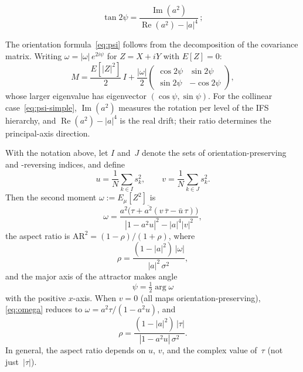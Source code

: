 \documentclass[10pt,a4paper]{amsart}
\begin{document}
\begin{equation}\label{eq:psi-simple}
  \tan 2\psi = \frac{\operatorname{Im}(a^2)}{\operatorname{Re}(a^2)-|a|^4}\,;
\end{equation}

\begin{remark}\label{rem:orientation}
The orientation formula~\eqref{eq:psi} follows from the decomposition
of the covariance matrix.  Writing $\omega = |\omega|\, e^{2i\psi}$
for $Z = X + iY$ with $E[Z]=0$:
\[
  M = \frac{E[|Z|^2]}{2}\,I
    + \frac{|\omega|}{2}
      \begin{pmatrix}\cos 2\psi & \sin 2\psi \\ \sin 2\psi & -\cos 2\psi\end{pmatrix},
\]
whose larger eigenvalue has eigenvector $(\cos\psi, \sin\psi)$.
For the collinear case~\eqref{eq:psi-simple},
$\operatorname{Im}(a^2)$ measures the rotation per level of the
IFS hierarchy, and $\operatorname{Re}(a^2)-|a|^4$ is the real drift;
their ratio determines the principal-axis direction.
\end{remark}

\begin{theorem}\label{thm:family}
With the notation above, let $I$ and~$J$ denote the sets of
orientation-preserving and -reversing indices, and define
\[
  u = \frac{1}{N}\!\sum_{k \in I}s_k^2,\qquad
  v = \frac{1}{N}\!\sum_{k \in J}s_k^2.
\]
Then the second moment $\omega := E_\mu[Z^2]$ is
\begin{equation}\label{eq:omega}
  \omega
  = \frac{a^2\bigl(\tau + \overline{a^2}(v\,\overline{\tau}
          - \bar{u}\,\tau)\bigr)}
         {|1-a^2 u|^2 - |a|^4|v|^2},
\end{equation}
the aspect ratio is
$\mathrm{AR}^2 = (1-\rho)/(1+\rho)$, where
\begin{equation}\label{eq:rho}
  \rho = \frac{(1-|a|^2)\,|\omega|}{|a|^2\,\sigma^2},
\end{equation}
and the major axis of the attractor makes angle
\begin{equation}\label{eq:psi}
  \psi = \tfrac{1}{2}\arg\omega
\end{equation}
with the positive $x$-axis.
When $v = 0$ \textup{(}all maps orientation-preserving\textup{)},
\eqref{eq:omega} reduces to
$\omega = a^2\tau/(1-a^2 u)$, and
\begin{equation}\label{eq:rho-pres}
  \rho = \frac{(1-|a|^2)\,|\tau|}{|1-a^2 u|\,\sigma^2}.
\end{equation}
In general, the aspect ratio depends on $u$, $v$, and the
complex value of~$\tau$ \textup{(}not just~$|\tau|$\textup{)}.
\end{theorem}
\end{document}
